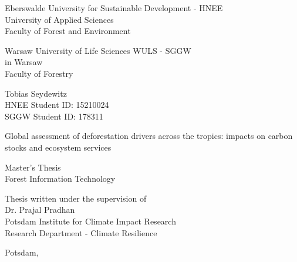 \begin{titlepage}
	\begin{singlespace}
		\begin{center}
			\Large{Eberswalde University for Sustainable Development - HNEE}\\
			\Large{University of Applied Sciences}\\
			\Large{Faculty of Forest and Environment}
			
			\smallskip

			\Large{Warsaw University of Life Sciences WULS - SGGW}\\
			\Large{in Warsaw}\\
			\Large{Faculty of Forestry}

			\bigskip

			\large{Tobias Seydewitz}\\
			\normalsize{HNEE Student ID: 15210024}\\
			\normalsize{SGGW Student ID: 178311}

			\vspace{2cm}
 
			 \huge{Global assessment of deforestation drivers across the tropics: impacts on carbon stocks and ecosystem services}

			\bigskip

			\large{Master's Thesis}\\
			\large{Forest Information Technology}

			\vspace{2cm}

			\begin{flushright}
				\normalsize{Thesis written under the supervision of}\\
				\normalsize{Dr. Prajal Pradhan}\\
				\normalsize{Potsdam Institute for Climate Impact Research}\\
				\normalsize{Research Department - Climate Resilience}
			\end{flushright}

			\vspace{4.5cm}

			\normalsize{Potsdam, \the\year}
		\end{center}
	\end{singlespace}
\end{titlepage}